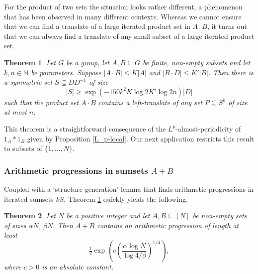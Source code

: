 \documentclass[12pt,a4paper,reqno]{amsart}
\numberwithin{equation}{section}
\theoremstyle{plain}
\newtheorem{theorem}{Theorem}[section]
\theoremstyle{definition}
\renewcommand{\leq}{\leqslant}
\renewcommand{\geq}{\geqslant}
\renewcommand{\subset}{\subseteq}
\def\N{\mathbb{N}}
\begin{document}
For the product of two sets the situation looks rather different, a phenomenon that has been observed in many different contexts. Whereas we cannot ensure that we can find a translate of a large iterated product set in $A \cdot B$, it turns out that we can always find a translate of any small subset of a large iterated product set.

\begin{theorem}\label{AB-struct}
Let $G$ be a group, let $A, B \subset G$ be finite, non-empty subsets and let $k, n \in \N$ be parameters. Suppose $|A \cdot B| \leq K|A|$ and $|B \cdot D| \leq K'|B|$. Then there is a symmetric set $S \subset D D^{-1}$ of size 
\[ |S| \geq \exp\left(-150 k^2 K \log{2K'} \log{2n} \right)|D| \]
such that the product set $A \cdot B$ contains a left-translate of any set $P \subset S^k$ of size at most $n$.
\end{theorem}

This theorem is a straightforward consequence of the $L^p$-almost-periodicity of $1_A*1_B$ given by Proposition \ref{L_p-local}. Our next application restricts this result to subsets of $\{1, \ldots, N\}$.

\subsubsection*{Arithmetic progressions in sumsets $A+B$}
Coupled with a `structure-generation' lemma that finds arithmetic progressions in iterated sumsets $kS$, Theorem \ref{AB-struct} quickly yields the following.

\begin{theorem}\label{A+B}
Let $N$ be a positive integer and let $A, B \subset [N]$ be non-empty sets of sizes $\alpha N$, $\beta N$. Then $A+B$ contains an arithmetic progression of length at least
\[ \tfrac{1}{2}\exp\left( c \left(\frac{\alpha \log{N}}{\log{4/\beta}} \right)^{1/4} \right), \]
where $c > 0$ is an absolute constant.
\end{theorem}
\end{document}
